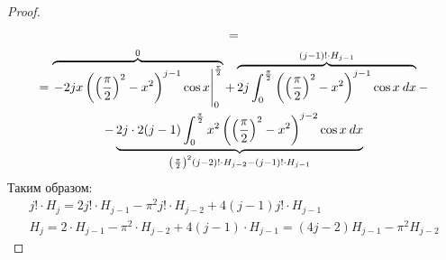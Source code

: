 \begin{enumerate}
\begin{proof}
\begin{equation*}
\begin{gathered}
        = \\ =
        \overbrace{\left.-2jx \left(\left(\frac{\pi}{2}\right)^2 - x^2\right)^{j - 1} \cos x \right|_{0}^{\frac{\pi}{2}}}^{\mathclap{0}}
        + \overbrace{2j \int_{{0}}^{{\frac{\pi}{2}}} {\left(\left(\frac{\pi}{2}\right)^2 - x^2\right)^{j - 1} \cos x} \: d{x}}^{\mathclap{(j - 1)! \cdot H_{j - 1}}} -\\
        - \underbrace{2j \cdot 2 (j - 1) \int_{{0}}^{{\frac{\pi}{2}}} {x^2\left(\left(\frac{\pi}{2}\right)^2 - x^2\right)^{j - 2} \cos x} \: d{x}}_{\mathclap{\left(\frac{\pi}{2}\right)^2(j - 2)!\cdot H_{j - 2} - (j - 1)!\cdot H_{j - 1}}}
      \end{gathered}
    \end{equation*}
    Таким образом:
    \begin{equation*}
      \begin{gathered}
        j! \cdot H_j = 2j!\cdot H_{j - 1} - \pi^2 j! \cdot H_{j - 2} + 4(j - 1)j! \cdot H_{j - 1}\\
        H_j = 2\cdot H_{j - 1} - \pi^2 \cdot H_{j - 2} + 4(j - 1) \cdot H_{j - 1} = (4j - 2)H_{j - 1} - \pi^2 H_{j - 2}
      \end{gathered}
    \end{equation*}
  \end{proof}
\end{enumerate}
